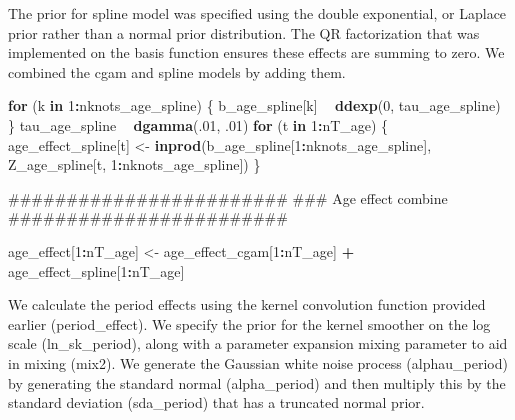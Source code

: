 \documentclass[11pt,]{article}
\newenvironment{Shaded}{\begin{snugshade}}{\end{snugshade}}
\newcommand{\KeywordTok}[1]{\textcolor[rgb]{0.13,0.29,0.53}{\textbf{#1}}}
\newcommand{\DecValTok}[1]{\textcolor[rgb]{0.00,0.00,0.81}{#1}}
\newcommand{\StringTok}[1]{\textcolor[rgb]{0.31,0.60,0.02}{#1}}
\newcommand{\ControlFlowTok}[1]{\textcolor[rgb]{0.13,0.29,0.53}{\textbf{#1}}}
\newcommand{\OperatorTok}[1]{\textcolor[rgb]{0.81,0.36,0.00}{\textbf{#1}}}
\newcommand{\NormalTok}[1]{#1}
\begin{document}
The prior for spline model was specified using the double exponential,
or Laplace prior rather than a normal prior distribution. The QR
factorization that was implemented on the basis function ensures these
effects are summing to zero. We combined the cgam and spline models by
adding them.

\begin{Shaded}
\begin{Highlighting}[]
  \ControlFlowTok{for}\NormalTok{ (k }\ControlFlowTok{in} \DecValTok{1}\OperatorTok{:}\NormalTok{nknots_age_spline) \{}
\NormalTok{    b_age_spline[k] }\OperatorTok{~}\StringTok{ }\KeywordTok{ddexp}\NormalTok{(}\DecValTok{0}\NormalTok{, tau_age_spline)}
\NormalTok{  \}}
\NormalTok{  tau_age_spline }\OperatorTok{~}\StringTok{ }\KeywordTok{dgamma}\NormalTok{(.}\DecValTok{01}\NormalTok{, .}\DecValTok{01}\NormalTok{)}
  \ControlFlowTok{for}\NormalTok{ (t }\ControlFlowTok{in} \DecValTok{1}\OperatorTok{:}\NormalTok{nT_age) \{}
\NormalTok{    age_effect_spline[t] <-}\StringTok{ }\KeywordTok{inprod}\NormalTok{(b_age_spline[}\DecValTok{1}\OperatorTok{:}\NormalTok{nknots_age_spline],}
\NormalTok{                                   Z_age_spline[t, }\DecValTok{1}\OperatorTok{:}\NormalTok{nknots_age_spline])}
\NormalTok{  \}}

\NormalTok{  ########################}
\NormalTok{  ### Age effect combine}
\NormalTok{  ########################}

\NormalTok{  age_effect[}\DecValTok{1}\OperatorTok{:}\NormalTok{nT_age] <-}\StringTok{ }\NormalTok{age_effect_cgam[}\DecValTok{1}\OperatorTok{:}\NormalTok{nT_age] }\OperatorTok{+}\StringTok{ }\NormalTok{age_effect_spline[}\DecValTok{1}\OperatorTok{:}\NormalTok{nT_age]}
\end{Highlighting}
\end{Shaded}

We calculate the period effects using the kernel convolution function
provided earlier (period\_effect). We specify the prior for the kernel
smoother on the log scale (ln\_sk\_period), along with a parameter
expansion mixing parameter to aid in mixing (mix2). We generate the
Gaussian white noise process (alphau\_period) by generating the standard
normal (alpha\_period) and then multiply this by the standard deviation
(sda\_period) that has a truncated normal prior.
\end{document}
